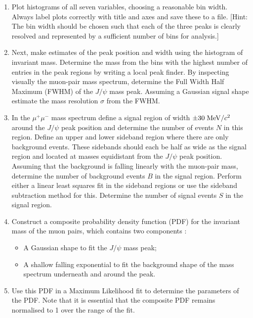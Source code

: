\begin{enumerate}

\item Plot histograms of all seven variables, choosing a reasonable bin width. Always label plots correctly with title and axes and save these to a file. [Hint: The bin width should be chosen such that each of the three peaks is clearly resolved and represented by a sufficient number of bins for analysis.]

\item Next, make estimates of the peak position and width using the histogram of invariant mass.  Determine the mass from the bins with the highest number of entries in the peak regions by writing a local peak finder. By inspecting visually the muon-pair mass spectrum, determine the Full Width Half Maximum (FWHM) of the $J/\psi$ mass peak. Assuming a Gaussian signal shape estimate the mass resolution $\sigma$ from the FWHM.

\item In the  $\mu^{+}\mu^{-}$  mass spectrum define a signal region of width $\pm 30\; {\rm MeV}/c^2$ around the $J/\psi$  peak position and determine the number of events $N$ in this region. Define an upper and lower sideband region where there are only background events. These sidebands should each be half as wide as the signal region and located at masses equidistant from the $J/\psi$  peak position. Assuming that the background is falling linearly with the muon-pair mass, determine the number of background events $B$ in the signal region. Perform either a linear least squares fit in the sideband regions or use the sideband subtraction method for this. Determine the number of signal events $S$ in the signal region.

\item Construct a composite probability density
function (PDF) for the invariant mass of the muon pairs, which
contains two components : 
\begin{itemize}
\item A Gaussian shape to fit the  $J/\psi$ mass peak;
\item A shallow falling exponential to fit the background shape of the mass spectrum underneath and around the peak.
\end{itemize}

\item Use this PDF in a Maximum Likelihood fit to determine the parameters of the PDF. Note that it is essential that the composite PDF remains normalised to 1 over the range of the fit.


\end{enumerate}
